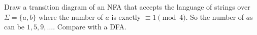 Draw a transition diagram of an NFA that accepts the language of
strings over $\Sigma = \{a,b\}$ where the number of $a$ is exactly
$\equiv 1\pmod 4$. So the number of $a$s can be $1,5,9,\ldots$.
Compare with a DFA.
\vspace{2in}
